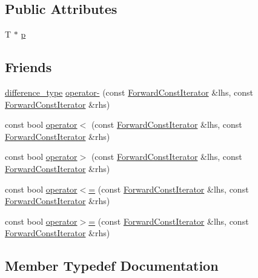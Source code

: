 \subsection*{Public Attributes}
\begin{DoxyCompactItemize}
\item 
T $\ast$ \hyperlink{classprism_1_1_forward_const_iterator_ad4e0c824b923c399c6ee381a03e66df2}{p}
\end{DoxyCompactItemize}
\subsection*{Friends}
\begin{DoxyCompactItemize}
\item 
\hyperlink{classprism_1_1_forward_const_iterator_ae2a7ad4082065395bff5ac5b724d4b6f}{difference\+\_\+type} \hyperlink{classprism_1_1_forward_const_iterator_ae77905649fbc553b53ac49c23262d818}{operator-\/} (const \hyperlink{classprism_1_1_forward_const_iterator}{Forward\+Const\+Iterator} \&lhs, const \hyperlink{classprism_1_1_forward_const_iterator}{Forward\+Const\+Iterator} \&rhs)
\item 
const bool \hyperlink{classprism_1_1_forward_const_iterator_a9eb40ce48ff747c184f7ac37ada4dcf2}{operator$<$} (const \hyperlink{classprism_1_1_forward_const_iterator}{Forward\+Const\+Iterator} \&lhs, const \hyperlink{classprism_1_1_forward_const_iterator}{Forward\+Const\+Iterator} \&rhs)
\item 
const bool \hyperlink{classprism_1_1_forward_const_iterator_a46cd17a5b9f20b1594ea9c3cdb2662f1}{operator$>$} (const \hyperlink{classprism_1_1_forward_const_iterator}{Forward\+Const\+Iterator} \&lhs, const \hyperlink{classprism_1_1_forward_const_iterator}{Forward\+Const\+Iterator} \&rhs)
\item 
const bool \hyperlink{classprism_1_1_forward_const_iterator_a82457c042ee5a0d20f1b2efa9452717f}{operator$<$=} (const \hyperlink{classprism_1_1_forward_const_iterator}{Forward\+Const\+Iterator} \&lhs, const \hyperlink{classprism_1_1_forward_const_iterator}{Forward\+Const\+Iterator} \&rhs)
\item 
const bool \hyperlink{classprism_1_1_forward_const_iterator_a34fc2d898f75bd850e25c645ebb05336}{operator$>$=} (const \hyperlink{classprism_1_1_forward_const_iterator}{Forward\+Const\+Iterator} \&lhs, const \hyperlink{classprism_1_1_forward_const_iterator}{Forward\+Const\+Iterator} \&rhs)
\end{DoxyCompactItemize}


\subsection{Member Typedef Documentation}
